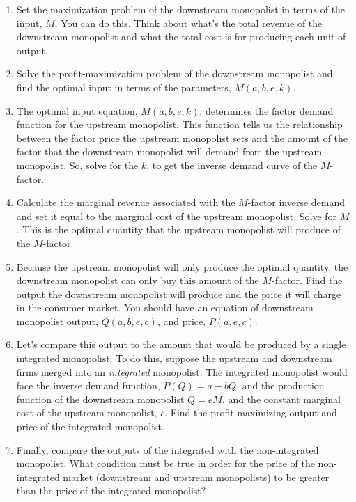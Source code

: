 \documentclass[
]{article}
\begin{document}
\begin{enumerate}
\def\labelenumi{\alph{enumi}.}
\item
  Set the maximization problem of the downstream monopolist in terms of
  the input, \(M\). You can do this. Think about what's the total
  revenue of the downstream monopolist and what the total cost is for
  producing each unit of output.
\item
  Solve the profit-maximization problem of the downstream monopolist and
  find the optimal input in terms of the parameters, \(M(a,b,e,k)\).
\item
  The optimal input equation, \(M(a,b,e,k)\), determines the factor
  demand function for the upstream monopolist. This function tells us
  the relationship between the factor price the upstream monopolist sets
  and the amount of the factor that the downstream monopolist will
  demand from the upstream monopolist. So, solve for the \(k\), to get
  the inverse demand curve of the \(M\)-factor.
\item
  Calculate the marginal revenue associated with the \(M\)-factor
  inverse demand and set it equal to the marginal cost of the upstream
  monopolist. Solve for \(M\). This is the optimal quantity that the
  upstream monopolist will produce of the \(M\)-factor.
\item
  Because the upstream monopolist will only produce the optimal
  quantity, the downstream monopolist can only buy this amount of the
  \(M\)-factor. Find the output the downstream monopolist will produce
  and the price it will charge in the consumer market. You should have
  an equation of downstream monopolist output, \(Q(a,b,e,c)\), and
  price, \(P(a,e,c)\).
\item
  Let's compare this output to the amount that would be produced by a
  single integrated monopolist. To do this, suppose the upstream and
  downstream firms merged into an \emph{integrated} monopolist. The
  integrated monopolist would face the inverse demand function,
  \(P(Q)=a-bQ\), and the production function of the downstream
  monopolist \(Q=eM\), and the constant marginal cost of the upstream
  monopolist, \(c\). Find the profit-maximizing output and price of the
  integrated monopolist.
\item
  Finally, compare the outputs of the integrated with the non-integrated
  monopolist. What condition must be true in order for the price of the
  non-integrated market (downstream and upstream monopolists) to be
  greater than the price of the integrated monopolist?
\end{enumerate}
\end{document}
